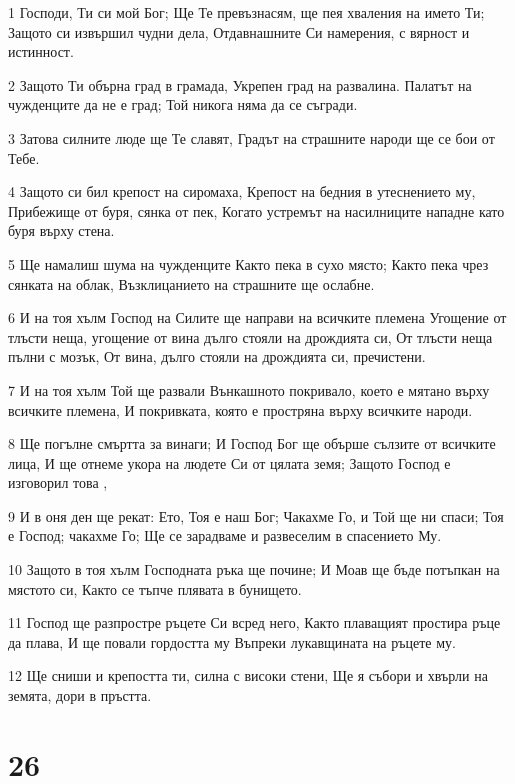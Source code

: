 \par 1 Господи, Ти си мой Бог; Ще Те превъзнасям, ще пея хваления на името Ти; Защото си извършил чудни дела, Отдавнашните Си намерения, с вярност и истинност.
\par 2 Защото Ти обърна град в грамада, Укрепен град на развалина. Палатът на чужденците да не е град; Той никога няма да се съгради.
\par 3 Затова силните люде ще Те славят, Градът на страшните народи ще се бои от Тебе.
\par 4 Защото си бил крепост на сиромаха, Крепост на бедния в утеснението му, Прибежище от буря, сянка от пек, Когато устремът на насилниците нападне като буря върху стена.
\par 5 Ще намалиш шума на чужденците Както пека в сухо място; Както пека чрез сянката на облак, Възклицанието на страшните ще ослабне.
\par 6 И на тоя хълм Господ на Силите ще направи на всичките племена Угощение от тлъсти неща, угощение от вина дълго стояли на дрождията си, От тлъсти неща пълни с мозък, От вина, дълго стояли на дрождията си, пречистени.
\par 7 И на тоя хълм Той ще развали Вънкашното покривало, което е мятано върху всичките племена, И покривката, която е простряна върху всичките народи.
\par 8 Ще погълне смъртта за винаги; И Господ Бог ще обърше сълзите от всичките лица, И ще отнеме укора на людете Си от цялата земя; Защото Господ е изговорил това ,
\par 9 И в оня ден ще рекат: Ето, Тоя е наш Бог; Чакахме Го, и Той ще ни спаси; Тоя е Господ; чакахме Го; Ще се зарадваме и развеселим в спасението Му.
\par 10 Защото в тоя хълм Господната ръка ще почине; И Моав ще бъде потъпкан на мястото си, Както се тъпче плявата в бунището.
\par 11 Господ ще разпростре ръцете Си всред него, Както плаващият простира ръце да плава, И ще повали гордостта му Въпреки лукавщината на ръцете му.
\par 12 Ще сниши и крепостта ти, силна с високи стени, Ще я събори и хвърли на земята, дори в пръстта.

\chapter{26}

